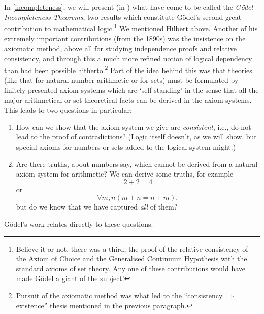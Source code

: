 In \cref{incompleteness}, we will present (in ) what have come to be called the \emph{G\"odel Incompleteness Theorems}, two results which constitute G\"odel's second great contribution to mathematical logic.\footnote{Believe it or not, there was a third, the proof of the relative consistency of the Axiom of Choice and the Generalised Continuum Hypothesis with the standard axioms of set theory. Any one of these contributions would have made G\"odel a giant of the subject!{}} We mentioned Hilbert above. Another of his extremely important contributions (from the 1890s) was the insistence on the axiomatic method, above all for studying independence proofs and relative consistency, and through this a much more refined notion of logical dependency than had been possible hitherto.\footnote{Pursuit of the axiomatic method was what led to the ``consistency $\Rightarrow$ existence'' thesis mentioned in the previous paragraph.}  Part of the idea behind this was  that theories (like that for natural number arithmetic or for sets) must be formulated by finitely presented axiom systems which are `self-standing' in the sense that  all the major arithmetical or set-theoretical facts can be derived in the axiom systems. This leads to two questions in particular:
\begin{enumerate}
  \item How can we show that the axiom system we give are
  \emph{consistent}, i.e., do not lead to the proof of contradictions?
  (Logic itself doesn't, as we will show, but special axioms for
  numbers or sets added to the logical system might.)
  \item Are there truths, about numbers say, which cannot be derived
  from a natural axiom system for arithmetic? We can derive some
  truths, for example \[2+2=4\] or \[\forall m, n (m+n=n+m),\]  but
  do  we know that we have captured \emph{all} of them?
\end{enumerate}
G\"odel's work relates directly to these questions. 

